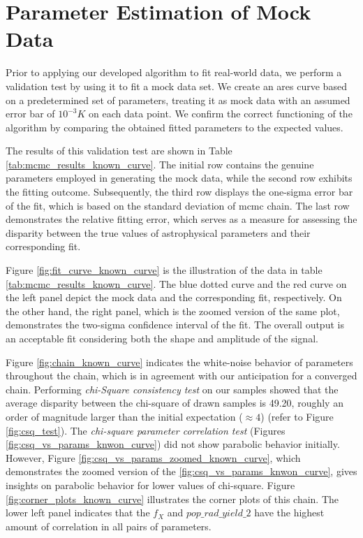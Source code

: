 \documentclass[12pt, TexShade, letterpaper]{report}
\begin{document}
\section{Parameter Estimation of Mock Data}
\label{chap:results,sub:known_curve}
Prior to applying our developed algorithm to fit real-world data, we perform a validation test by using it to fit a mock data set. We create an \gls{ares} curve based on a predetermined set of parameters, treating it as mock data with an assumed error bar of $10^{-3}K$ on each data point. We confirm the correct functioning of the algorithm by comparing the obtained fitted parameters to the expected values.\par
The results of this validation test are shown in Table \ref{tab:mcmc_results_known_curve}. The initial row contains the genuine parameters employed in generating the mock data, while the second row exhibits the fitting outcome. Subsequently, the third row displays the one-sigma error bar of the fit, which is based on the standard deviation of \gls{mcmc} chain. The last row demonstrates the relative fitting error, which serves as a measure for assessing the disparity between the true values of astrophysical parameters and their corresponding fit.\par 
Figure \ref{fig:fit_curve_known_curve} is the illustration of the data in table \ref{tab:mcmc_results_known_curve}. 
The blue dotted curve and the red curve on the left panel depict the mock data and the corresponding fit, respectively.
On the other hand, the right panel, which is the zoomed version of the same plot, demonstrates the two-sigma confidence interval of the fit. The overall output is an acceptable fit considering both the shape and amplitude of the signal.\par
Figure \ref{fig:chain_known_curve} indicates the white-noise behavior of parameters throughout the chain, which is in agreement with our anticipation for a converged chain. Performing \emph{chi-Square consistency test} on our samples showed that the average disparity between the chi-square of drawn samples is 49.20, roughly an order of magnitude larger than the initial expectation ($\approx4$) (refer to Figure \ref{fig:csq_test}). The \emph{chi-square parameter correlation test} (Figures \ref{fig:csq_vs_params_knwon_curve}) did not show parabolic behavior initially. However, Figure \ref{fig:csq_vs_params_zoomed_known_curve}, which demonstrates the zoomed version of the \ref{fig:csq_vs_params_knwon_curve}, gives insights on parabolic behavior for lower values of chi-square. Figure \ref{fig:corner_plots_known_curve} illustrates the corner plots of this chain. The lower left panel indicates that the $f_X$ and $pop\_rad\_ yield\_2$ have the highest amount of correlation in all pairs of parameters.\par
\end{document}
